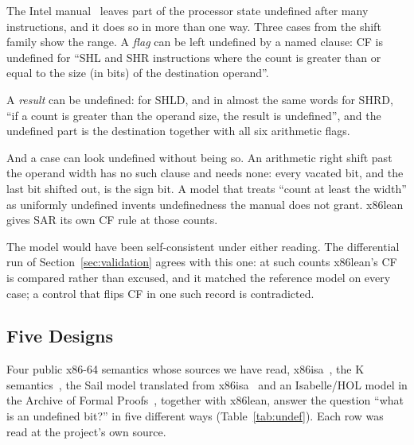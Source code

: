 \documentclass[runningheads]{llncs}
\newcommand{\src}[1]{}  %
\begin{document}
The Intel manual~\cite{intel-sdm} leaves part of the processor state undefined after many
instructions, and it does so in more than one way. Three cases from the shift family show the range.
A \emph{flag} can be left undefined by a named clause: CF is undefined for ``SHL and SHR instructions
where the count is greater than or equal to the size (in bits) of the destination operand''.
\src{docs/DECISIONS.md D20; the wording re-read at the cited edition's PDF (325462-092US, SAL/SAR/SHL/SHR, Flags Affected) 2026-09-15,
where it carries ``(in bits)'', which this quotation dropped until then; X86/Flags.lean:194 has it; docs/DECISIONS.md D249}
A \emph{result} can be undefined: for SHLD, and in almost the same words for SHRD, ``if a count is
greater than the operand size, the result is undefined'', and the undefined part is the destination
together with all six arithmetic flags.
\src{docs/DECISIONS.md D52; both descriptions and both Flags Affected sections (``If the count is greater than the operand size, the
flags are undefined'') re-read at 325462-092US 2026-09-15, docs/DECISIONS.md D249; SHLD's own article (``If a count'', SHRD ``If the count'') re-read at
093US 2026-10-14}
And a case can look undefined without being so. An arithmetic right shift past the operand width has
no such clause and needs none: every vacated bit, and the last bit shifted out, is the sign bit. A
model that treats ``count at least the width'' as uniformly undefined invents undefinedness the manual
does not grant. x86lean gives SAR its own CF rule at those counts.
\src{X86/Flags.lean shiftFlags; docs/DECISIONS.md D20}
The model would have been self-consistent under either reading. The differential run of
Section~\ref{sec:validation} agrees with this one: at such counts x86lean's CF is compared rather than
excused, and it matched the reference model on every case; a control that flips CF in one such record is
contradicted.
\src{docs/DECISIONS.md D20; docs/DIFFERENTIAL-P1-BATCH7.md section 3, the planted control on sar\_b9/6 (a flipped record, not a model copy);
under the other reading CF would be in the derived undefined set and a disagreement would be explained, so the run could not have
refuted it by a disagreement (D250)}

\subsection{Five Designs}
\label{sec:undef:designs}

Four public x86-64 semantics whose sources we have read, x86isa~\cite{goel-x86isa,x86isa-repo},
the K semantics~\cite{dasgupta-k-x86,k-x86-repo}, the Sail model translated from
x86isa~\cite{sail-x86-repo} and an Isabelle/HOL model in the Archive of Formal Proofs~\cite{afp-x86},
together with x86lean, answer the question ``what is an undefined bit?'' in five different ways
(Table~\ref{tab:undef}). Each row was read at the project's own source.
\src{docs/TACAS-G1-POSITIONING.md 1c.6 and 1c.10}
\end{document}
